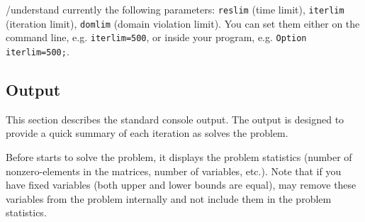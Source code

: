 
\MYGAMS/\IPOPT understand currently the following \MYGAMS parameters: \texttt{reslim} (time limit), \texttt{iterlim} (iteration limit), \texttt{domlim} (domain violation limit).
You can set them either on the command line, e.g. \verb+iterlim=500+, or inside your \MYGAMS program, e.g. \verb+Option iterlim=500;+.


\subsection{Output}

This section describes the standard \IPOPT console output.
The output is designed to provide a quick summary of each iteration as \IPOPT solves the problem.

Before \IPOPT starts to solve the problem, it displays the problem statistics (number of nonzero-elements in the matrices, number of variables, etc.).
Note that if you have fixed variables (both upper and lower bounds are equal), \IPOPT may remove these variables from the problem internally and not include them in the problem statistics.

